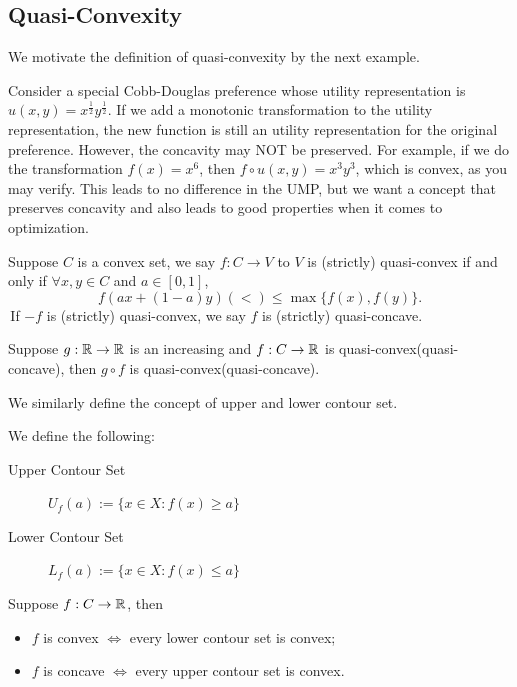 \subsection{Quasi-Convexity}
We motivate the definition of quasi-convexity by the next example.
\begin{example}
    Consider a special Cobb-Douglas preference whose utility representation is $u(x,y) = x^{\frac{1}{2}}y^{\frac{1}{2}}$. If we add a monotonic transformation
to the utility representation, the new function is still an utility representation for the original preference. However, the concavity may NOT be preserved. For example, if we do the 
transformation $f(x) = x^6$, then $f\circ u (x,y)=x^3y^3$, which is convex, as you may verify. This leads to no difference in the UMP, but we want a concept that preserves concavity and also
leads to good properties when it comes to optimization.
\end{example}

\begin{definition}
    Suppose $C$ is a convex set, we say $f: C\to V$ to $V$ is (strictly) quasi-convex if and only if 
$\forall x,y\in C$ and $a\in [0,1]$, $$f(ax+(1-a)y) (<)\leq \max\{f(x),f(y)\}.$$
\,If $-f$ is (strictly) quasi-convex, we say $f$ is (strictly) quasi-concave.
\end{definition}

\begin{proposition}
    Suppose $g:\mathbb{R}\to \mathbb{R}$ is an increasing and $f: C\to \mathbb{R}$ is quasi-convex(quasi-concave), then $g\circ f$ is quasi-convex(quasi-concave).
\end{proposition}

We similarly define the concept of upper and lower contour set.
\begin{definition}
        We define the following:
    \begin{description}
        \item[Upper Contour Set] $U_f(a):=\{x\in X: f(x)\geq a\}$
        \item[Lower Contour Set] $L_f(a):=\{x \in X: f(x)\leq a\}$
    \end{description}
\end{definition}

\begin{proposition}
    Suppose $f:C\to \mathbb{R}$, then 
    \begin{itemize}
        \item $f$ is convex $\iff$ every lower contour set is convex;
        \item $f$ is concave $\iff$ every upper contour set is convex.
    \end{itemize}
\end{proposition}

